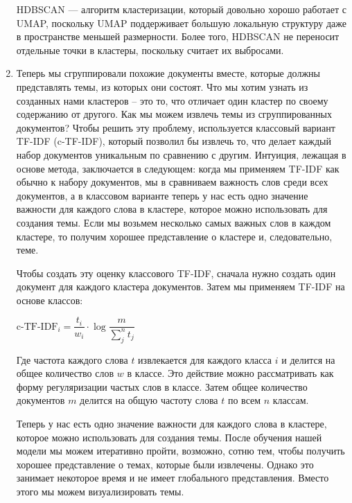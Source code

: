 \begin{enumerate}
HDBSCAN --- алгоритм кластеризации, который довольно хорошо работает с UMAP, поскольку UMAP поддерживает большую локальную структуру даже в пространстве меньшей размерности. Более того, HDBSCAN не переносит отдельные точки в кластеры, поскольку считает их выбросами.

\item Теперь мы сгруппировали похожие документы вместе, которые должны представлять темы, из которых они состоят. Что мы хотим узнать из созданных нами кластеров -- это то, что отличает один кластер по своему содержанию от другого.  Как мы можем извлечь темы из сгруппированных документов? Чтобы решить эту проблему, используется классовый вариант TF-IDF (c-TF-IDF), который позволил бы извлечь то, что делает каждый набор документов уникальным по сравнению с другим. Интуиция, лежащая в основе метода, заключается в следующем: когда мы применяем TF-IDF как обычно к набору документов, мы в сравниваем важность слов среди всех документов, а в классовом варианте теперь у нас есть одно значение важности для каждого слова в кластере, которое можно использовать для создания темы. Если мы возьмем несколько  самых важных слов в каждом кластере, то получим хорошее представление о кластере и, следовательно, теме.

Чтобы создать эту оценку классового TF-IDF, сначала нужно создать один документ для каждого кластера документов.
Затем мы применяем TF-IDF на основе классов:

\begin{center}
$\text{c-TF-IDF}_{i} = 
\dfrac{t_i}{w_i} \cdot 
\log{
\dfrac{m}{\sum\limits_j^n t_j}}$
\end{center}

Где частота каждого слова $t$ извлекается для каждого класса $i$ и делится на общее количество слов $w$ в классе. Это действие можно рассматривать как форму регуляризации частых слов в классе. Затем общее количество документов $m$ делится на общую частоту слова $t$ по всем $n$ классам.

Теперь у нас есть одно значение важности для каждого слова в кластере, которое можно использовать для создания темы. После обучения нашей модели мы можем итеративно пройти, возможно, сотню тем, чтобы получить хорошее представление о темах, которые были извлечены. Однако это занимает некоторое время и не имеет глобального представления. Вместо этого мы можем визуализировать темы. 

\end{enumerate}

